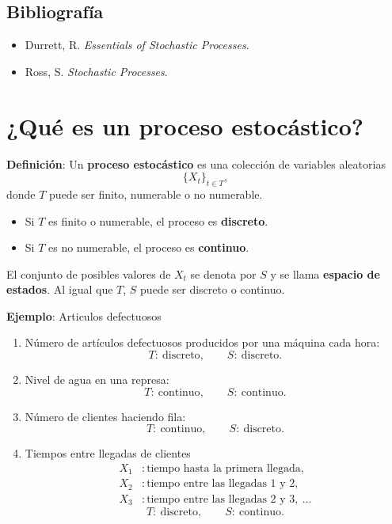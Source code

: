 \documentclass[12pt,a4paper]{article}
\begin{document}
\subsection*{Bibliografía}
\begin{itemize}
    \item Durrett, R. \textit{Essentials of Stochastic Processes}.
    \item Ross, S. \textit{Stochastic Processes}.
\end{itemize}

\section{¿Qué es un proceso estocástico?}
\textbf{Definición}: Un \textbf{proceso estocástico} es una colección de variables aleatorias
\begin{equation*}
\{X_t\}_{t\in T},
\end{equation*}
donde $T$ puede ser finito, numerable o no numerable.
\begin{itemize}
    \item Si $T$ es finito o numerable, el proceso es \textbf{discreto}.
    \item Si $T$ es no numerable, el proceso es \textbf{continuo}.
\end{itemize}
El conjunto de posibles valores de $X_t$ se denota por $S$ y se llama \textbf{espacio de estados}. Al igual que $T$, $S$ puede ser discreto o continuo.

\textbf{Ejemplo}: Articulos defectuosos
\begin{enumerate}
    \item Número de artículos defectuosos producidos por una máquina cada hora:
    \begin{equation*}
    T:\ \text{discreto}, \qquad S:\ \text{discreto}.
    \end{equation*}
    \item Nivel de agua en una represa:
    \begin{equation*}
    T:\ \text{continuo}, \qquad S:\ \text{continuo}.
    \end{equation*}
    \item Número de clientes haciendo fila:
    \begin{equation*}
    T:\ \text{continuo}, \qquad S:\ \text{discreto}.
    \end{equation*}
    \item Tiempos entre llegadas de clientes
    \begin{align*}
        X_1 &: \text{tiempo hasta la primera llegada},\\
        X_2 &: \text{tiempo entre las llegadas 1 y 2},\\
        X_3 &: \text{tiempo entre las llegadas 2 y 3},\ \ldots
    \end{align*}
    \begin{equation*}
    T:\ \text{discreto}, \qquad S:\ \text{continuo}.
    \end{equation*}
\end{enumerate}
\end{document}
